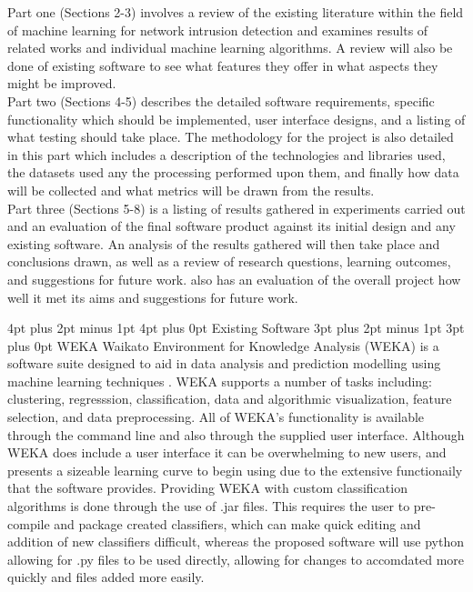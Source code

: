 \documentclass[12pt,a4paper]{article}
\makeatletter
\renewcommand\subsection{\@startsection {subsection}{1}{2mm} %
      {3pt plus 2pt minus 1pt} %
      {3pt plus 0pt} %
      {\normalfont\bfseries}}
\renewcommand\section{\@startsection {section}{1}{0mm} %
      {4pt plus 2pt minus 1pt} %
      {4pt plus 0pt} %
      {\bfseries}}
\makeatother
\begin{document}
Part one (Sections 2-3) involves a review of the existing literature within the field of machine learning for network intrusion detection and examines results of related works and individual machine learning algorithms. A review will also be done of existing software to see what features they offer in what aspects they might be improved. \\

Part two (Sections 4-5) describes the detailed software requirements, specific functionality which should be implemented, user interface designs, and a listing of what testing should take place. The methodology for the project is also detailed in this part which includes a description of the technologies and libraries used, the datasets used any the processing performed upon them, and finally how data will be collected and what metrics will be drawn from the results. \\

Part three (Sections 5-8) is a listing of results gathered in experiments carried out and an evaluation of the final software product against its initial design and any existing software. An analysis of the results gathered will then take place and conclusions drawn, as well as a review of research questions, learning outcomes, and suggestions for future work. also has an evaluation of the overall project how well it met its aims and suggestions for future work.



\newpage
\section{Existing Software}
\subsection{WEKA}
Waikato Environment for Knowledge Analysis (WEKA) is a software suite designed to aid in data analysis and prediction modelling using machine learning techniques \cite{hall2009weka}. WEKA supports a number of tasks including: clustering, regresssion, classification, data and algorithmic visualization, feature selection, and data preprocessing. All of WEKA's functionality is available through the command line and also through the supplied user interface. Although WEKA does include a user interface it can be overwhelming to new users, and presents a sizeable learning curve to begin using due to the extensive functionaily that the software provides. Providing WEKA with custom classification algorithms is done through the use of .jar files. This requires the user to pre-compile and package created classifiers, which can make quick editing and addition of new classifiers difficult, whereas the proposed software will use python allowing for .py files to be used directly, allowing for changes to accomdated more quickly and files added more easily.
\end{document}

